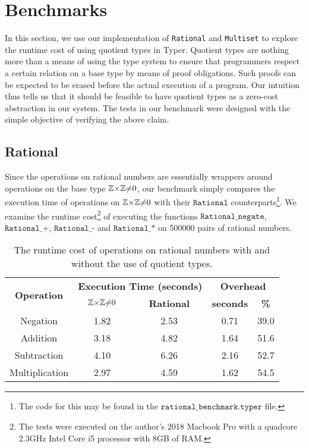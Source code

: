 \documentclass[12pt,twoside,maitrise]{dms}
\theoremstyle{definition}
\numberwithin{equation}{section}
\numberwithin{table}{chapter}
\numberwithin{figure}{chapter}
\newcommand\id[1] {\texttt{#1}}
\newcommand\fn[1] {\texttt{#1}}
\begin{document}
\section*{Benchmarks}\label{sec:quot-benchmark}

In this section, we use our implementation of \id{Rational} and \id{Multiset} to
explore the runtime cost of using quotient types in Typer. Quotient types are
nothing more than a means of using the type system to ensure that programmers
respect a certain relation on a base type by means of proof obligations. Such
proofs can be expected to be erased before the actual execution of a program.
Our intuition thus tells us that it should be feasible to have quotient types as
a zero-cost abstraction in our system. The tests in our benchmark were designed
with the simple objective of verifying the above claim.

\subsection*{Rational}

Since the operations on rational numbers are essentially wrappers around
operations on the base type $\mathbb{Z}{\times}\mathbb{Z}{\ne}0$, our benchmark simply compares the
execution time of operations on $\mathbb{Z}{\times}\mathbb{Z}{\ne}0$ with their $\fn{Rational}$
counterparts\footnote{The code for this may be found in the
$\fn{rational\_benchmark.typer}$ file.}. We examine the runtime
cost\footnote{The tests were executed on the author's 2018 Macbook Pro with a
quadcore 2.3GHz Intel Core i5 processor with 8GB of RAM.} of executing the
functions $\fn{Rational\_negate}$, $\fn{Rational\_+}$, $\fn{Rational\_-}$ and
$\fn{Rational\_*}$ on 500000 pairs of rational numbers.

\begin{table}[H]
\centering
\begin{tabular}{ccccc}
\hline
\multirow{2}{*}{\textbf{Operation}} & \multicolumn{2}{c}{\textbf{Execution Time (seconds)}} & \multicolumn{2}{c}{\textbf{Overhead}} \\ \cline{2-5}
                                    & \textbf{$\mathbb{Z}{\times}\mathbb{Z}{\ne}0$}          & \textbf{Rational}         & \textbf{seconds}     & \textbf{\%}    \\ \hline
Negation       & 1.82 & 2.53 & 0.71 & 39.0 \\
Addition       & 3.18 & 4.82 & 1.64 & 51.6 \\
Subtraction    & 4.10 & 6.26 & 2.16 & 52.7 \\
Multiplication & 2.97 & 4.59 & 1.62 & 54.5 \\ \hline
\end{tabular}
\caption{The runtime cost of operations on rational numbers with and without the
  use of quotient types.}\label{tab:rational-benchmark}
\end{table}
\end{document}
